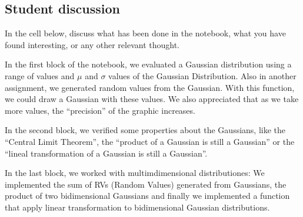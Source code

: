 \documentclass[11pt]{article}
\begin{document}
    \hypertarget{student-discussion}{%
\subsection{Student discussion}\label{student-discussion}}

In the cell below, discuss what has been done in the notebook, what you
have found interesting, or any other relevant thought.

    { In the first block of the notebook, we evaluated a Gaussian
distribution using a range of values and \(\mu\) and \(\sigma\) values
of the Gaussian Distribution. Also in another assignment, we generated
random values from the Gaussian. With this function, we could draw a
Gaussian with these values. We also appreciated that as we take more
values, the ``precision'' of the graphic increases. }

{ In the second block, we verified some properties about the Gaussians,
like the ``Central Limit Theorem'', the ``product of a Gaussian is still
a Gaussian'' or the ``lineal transformation of a Gaussian is still a
Gaussian''. }

{ In the last block, we worked with multimdimensional distributiones: We
implemented the sum of RVs (Random Values) generated from Gaussians, the
product of two bidimensional Gaussians and finally we implemented a
function that apply linear transformation to bidimensional Gaussian
distributions. }


    
    
    
\end{document}
